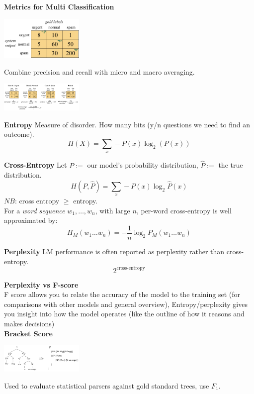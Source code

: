 \documentclass[8pt]{extarticle} %
\begin{document}
\begin{multicols*}{3}
\textbf{Metrics for Multi Classification}
\begin{center}
    \includegraphics[width=0.3\textwidth]{media/confusion-matrix.png}
\end{center}
Combine precision and recall with micro and macro averaging.\\
\begin{center}
    \includegraphics[width=0.3\textwidth]{media/micromacro-averaging.png}
\end{center}

\textbf{Entropy}
Measure of disorder. How many bits (y/n questions we need to find an outcome).
$$H(X)=\sum_x-P(x) \log _2(P(x))$$

\textbf{Cross-Entropy}
Let $P:=$ our model's probability distribution, $\hat{P}:=$ the true distribution.
$$H(P, \hat{P})=\sum_x-P(x) \log _2 \hat{P}(x)$$
$NB$: cross entropy $\geq$ entropy.\\
For a \textit{word sequence} $w_1, \ldots, w_n$, with large $n$, per-word cross-entropy is well approximated by:
$$H_M\left(w_1 \ldots w_n\right)=-\frac{1}{n} \log _2 P_M\left(w_1 \ldots w_n\right)$$

\textbf{Perplexity} LM performance is often reported as perplexity rather than cross-entropy.$$2^\text{cross-entropy}$$

\textbf{Perplexity vs F-score}\\
F score allows you to relate the accuracy of the model to the training set (for comparisons with other models and general overview), Entropy/perplexity gives you insight into how the model operates (like the outline of how it reasons and makes decisions)\\

\textbf{Bracket Score}
\begin{center}
    \includegraphics[width=0.3\textwidth]{media/bracket-score.png}
\end{center}
Used to evaluate statistical parsers against gold standard trees, use $F_1$.\\


\end{multicols*}
\end{document}

